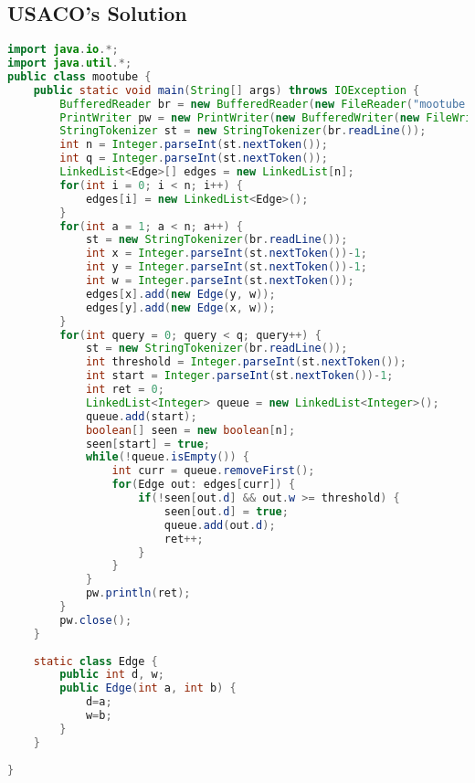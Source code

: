 \documentclass{article}
\begin{document}
\subsection{USACO's Solution}
\begin{lstlisting}[language=Java, caption="Java solution by USACO"]
import java.io.*;
import java.util.*;
public class mootube {
	public static void main(String[] args) throws IOException {
		BufferedReader br = new BufferedReader(new FileReader("mootube.in"));
		PrintWriter pw = new PrintWriter(new BufferedWriter(new FileWriter("mootube.out")));
		StringTokenizer st = new StringTokenizer(br.readLine());
		int n = Integer.parseInt(st.nextToken());
		int q = Integer.parseInt(st.nextToken());
		LinkedList<Edge>[] edges = new LinkedList[n];
		for(int i = 0; i < n; i++) {
			edges[i] = new LinkedList<Edge>();
		}
		for(int a = 1; a < n; a++) {
			st = new StringTokenizer(br.readLine());
			int x = Integer.parseInt(st.nextToken())-1;
			int y = Integer.parseInt(st.nextToken())-1;
			int w = Integer.parseInt(st.nextToken());
			edges[x].add(new Edge(y, w));
			edges[y].add(new Edge(x, w));
		}
		for(int query = 0; query < q; query++) {
			st = new StringTokenizer(br.readLine());
			int threshold = Integer.parseInt(st.nextToken());
			int start = Integer.parseInt(st.nextToken())-1;
			int ret = 0;
			LinkedList<Integer> queue = new LinkedList<Integer>();
			queue.add(start);
			boolean[] seen = new boolean[n];
			seen[start] = true;
			while(!queue.isEmpty()) {
				int curr = queue.removeFirst();
				for(Edge out: edges[curr]) {
					if(!seen[out.d] && out.w >= threshold) {
						seen[out.d] = true;
						queue.add(out.d);
						ret++;
					}
				}
			}
			pw.println(ret);
		}
		pw.close();
	}
	
	static class Edge {
		public int d, w;
		public Edge(int a, int b) {
			d=a;
			w=b;
		}
	}
		
}
\end{lstlisting}
\end{document}

